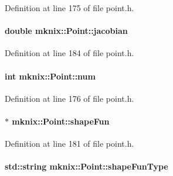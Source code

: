 Definition at line 175 of file point.\+h.

\hypertarget{classmknix_1_1_point_a7afc6bd82b8e3619d384a41d9c2f1601}{}
\paragraph[{jacobian}]{\setlength{\rightskip}{0pt plus 5cm}double mknix\+::\+Point\+::jacobian\hspace{0.3cm}{\ttfamily [protected]}}\label{classmknix_1_1_point_a7afc6bd82b8e3619d384a41d9c2f1601}


Definition at line 184 of file point.\+h.

\hypertarget{classmknix_1_1_point_a685cfce9b9c1da43e3a2460b6c0a6855}{}
\paragraph[{num}]{\setlength{\rightskip}{0pt plus 5cm}int mknix\+::\+Point\+::num\hspace{0.3cm}{\ttfamily [protected]}}\label{classmknix_1_1_point_a685cfce9b9c1da43e3a2460b6c0a6855}


Definition at line 176 of file point.\+h.

\hypertarget{classmknix_1_1_point_a852c997f667d6029c6062ef68582c275}{}
\paragraph[{shape\+Fun}]{$\ast$ mknix\+::\+Point\+::shape\+Fun\hspace{0.3cm}{\ttfamily [protected]}}\label{classmknix_1_1_point_a852c997f667d6029c6062ef68582c275}


Definition at line 181 of file point.\+h.

\hypertarget{classmknix_1_1_point_a60c4d06445f397a9813b9a7f2a563d0d}{}
\paragraph[{shape\+Fun\+Type}]{\setlength{\rightskip}{0pt plus 5cm}std\+::string mknix\+::\+Point\+::shape\+Fun\+Type\hspace{0.3cm}{\ttfamily [protected]}}\label{classmknix_1_1_point_a60c4d06445f397a9813b9a7f2a563d0d}


